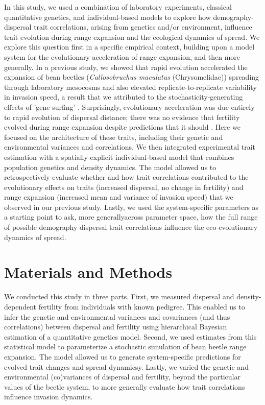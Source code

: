\documentclass[11pt]{article}
\begin{document}
In this study, we used a combination of laboratory experiments, classical quantitative genetics, and individual-based models to explore how demography-dispersal trait correlations, arising from genetics and/or environment, influence trait evolution during range expansion and the ecological dynamics of spread.
We explore this question first in a specific empirical context, building upon a model system for the evolutionary acceleration of range expansion, and then more generally.
In a previous study, we showed that rapid evolution accelerated the expansion of bean beetles (\textit{Callosobruchus maculatus} (Chrysomelidae)) spreading through laboratory mesocosms and also elevated replicate-to-replicate variability in invasion speed, a result that we attributed to the stochasticity-generating effects of 'gene surfing' \citep{ochocki_rapid_2017}.
Surprisingly, evolutionary acceleration was due entirely to rapid evolution of dispersal distance; there was no evidence that fertility evolved during range expansion despite predictions that it should \citep{ochocki_rapid_2017}.
Here we focused on the architecture of these traits, including their genetic and environmental variances and correlations.
We then integrated experimental trait estimation with a spatially explicit individual-based model that combines population genetics and density dynamics.
The model allowed us to retrospectively evaluate whether and how trait correlations contributed to the evolutionary effects on traits (increased dispersal, no change in fertility) and range expansion (increased mean and variance of invasion speed) that we observed in our previous study.
Lastly, we used the system-specific parameters as a starting point to ask, more generallyacross parameter space, how the full range of possible demography-dispersal trait correlations influence the eco-evolutionary dynamics of spread.

\section*{Materials and Methods}

We conducted this study in three parts.
First, we measured dispersal and density-dependent fertility from individuals with known pedigree.
This enabled us to infer the genetic and environmental variances and covariances (and thus correlations) between dispersal and fertility using hierarchical Bayesian estimation of a quantitative genetics model.
Second, we used estimates from this statistical model to parameterize a stochastic simulation of bean beetle range expansion.
The model allowed us to generate system-specific predictions for evolved trait changes and spread dynamicsy.
Lastly, we varied the genetic and environmental (co)variances of dispersal and fertility, beyond the particular values of the beetle system, to more generally evaluate how trait correlations influence invasion dynamics.
\end{document}
